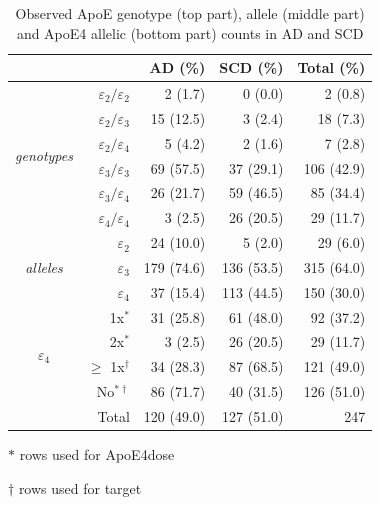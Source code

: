 \documentclass{amsart}
\begin{document}
\begin{table}
  \caption{Observed ApoE genotype (top part), allele (middle part) and ApoE4 allelic (bottom part) counts in AD and SCD}
\begin{threeparttable}
\centering 
\label{tab:ApoEfreq}
  \begin{tabular}{crrrr} \toprule
    \multicolumn{1}{l}{}                & \multicolumn{1}{l}{}               & AD (\%)    & SCD (\%)   & Total (\%)  \\ \midrule
    \multirow{6}{*}{\textit{genotypes}} & $\varepsilon_2/\varepsilon_2$        & 2 (1.7)    & 0 (0.0)    & 2 (0.8)     \\
                                        & $\varepsilon_2/\varepsilon_3$      & 15 (12.5)  & 3 (2.4)    & 18 (7.3)    \\
                                        & $\varepsilon_2/\varepsilon_4$      & 5 (4.2)    & 2 (1.6)    & 7 (2.8)     \\
                                        & $\varepsilon_3/\varepsilon_3$      & 69 (57.5)  & 37 (29.1)  & 106 (42.9)  \\
                                        & $\varepsilon_3/\varepsilon_4$      & 26 (21.7)  & 59 (46.5)  & 85 (34.4)   \\
                                        & $\varepsilon_4/\varepsilon_4$      & 3 (2.5)    & 26 (20.5)  & 29 (11.7)   \\ \midrule
   \multirow{3}{*}{\textit{alleles}}    & $\varepsilon_2$    & 24 (10.0)  & 5 (2.0)    & 29 (6.0)    \\
                                        & $\varepsilon_3$    & 179 (74.6) & 136 (53.5) & 315 (64.0)    \\
                                        & $\varepsilon_4$   & 37 (15.4)  & 113 (44.5) & 150 (30.0)    \\ \midrule
    \multirow{4}{*}{$\varepsilon_4$}   & 1x$^\ast$            & 31 (25.8)  & 61 (48.0)  & 92 (37.2)   \\
                                        & 2x$^\ast$            & 3 (2.5)    & 26 (20.5)  & 29 (11.7)   \\
                                        & $\geq$ 1x$ ^\dagger$ & 34 (28.3)  & 87 (68.5)  & 121 (49.0)  \\
                                        & No$^{\ast\dagger}$     & 86 (71.7)  & 40 (31.5)  & 126 (51.0)  \\ \midrule
    \multicolumn{2}{r}{Total}                                                & 120 (49.0)       & 127 (51.0)       & 247         \\ \bottomrule
  \end{tabular}
  \begin{tablenotes}
    \item[$\ast$] rows used for ApoE4dose
    \item[$\dagger$] rows used for target 
  \end{tablenotes}
\end{threeparttable}
\end{table}
\end{document}
